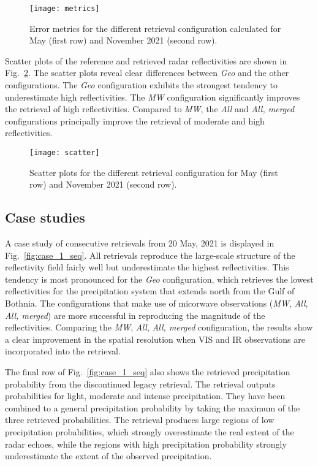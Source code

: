 \documentclass[11pt]{scrartcl}
\begin{document}
\begin{figure}
  \centering
  \texttt{[image: metrics]}
  \caption{
    Error metrics for the different retrieval configuration calculated for May (first row) and
    November 2021 (second row).
    }
  \label{fig:metrics}
\end{figure}

Scatter plots of the reference and retrieved radar reflectivities are shown in
Fig.~\ref{fig:scatter}. The scatter plots reveal clear differences between
\textit{Geo} and the other configurations. The \textit{Geo} configuration
exhibits the strongest tendency to underestimate high reflectivities. The
\textit{MW} configuration significantly improves the retrieval of high
reflectivities. Compared to \textit{MW}, the \textit{All} and \textit{All,
  merged} configurations principally improve the retrieval of moderate and high
reflectivities.


\begin{figure}
  \centering
  \texttt{[image: scatter]}
  \caption{
    Scatter plots for the different retrieval configuration for May (first row) and
    November 2021 (second row).
  }
  \label{fig:scatter}
\end{figure}

\subsection{Case studies}

A case study of consecutive retrievals from 20 May, 2021 is displayed in
Fig.~\ref{fig:case_1_seq}. All retrievals reproduce the large-scale structure of
the reflectivity field fairly well but underestimate the highest reflectivities.
This tendency is most pronounced for the \textit{Geo} configuration, which
retrieves the lowest reflectivities for the precipitation system that extends
north from the Gulf of Bothnia. The configurations that make use of micorwave
observations (\textit{MW}, \textit{All}, \textit{All, merged}) are more
successful in reproducing the magnitude of the reflectivities. Comparing the
\textit{MW}, \textit{All}, \textit{All, merged} configuration, the results show
a clear improvement in the spatial resolution  when VIS and IR
observations are incorporated into the retrieval.

The final row of Fig.~\ref{fig:case_1_seq} also shows the retrieved
precipitation probability from the discontinued legacy retrieval. The retrieval
outputs probabilities for light, moderate and intense precipitation. They have
been combined to a general precipitation probability by taking the maximum of
the three retrieved probabilities. The retrieval produces large regions of
low precipitation probabilities, which strongly overestimate the real extent
of the radar echoes, while the regions with high precipitation probability
strongly underestimate the extent of the observed precipitation.
\end{document}
